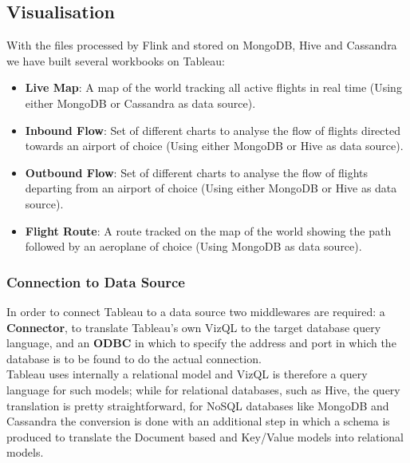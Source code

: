 \subsection{Visualisation}

With the files processed by Flink and stored on MongoDB, Hive and Cassandra we have built several workbooks on Tableau:

\begin{itemize}
	\item \textbf{Live Map}: A map of the world tracking all active flights in real time (Using either MongoDB or Cassandra as data source).
	\item \textbf{Inbound Flow}: Set of different charts to analyse the flow of flights directed towards an airport of choice (Using either MongoDB or Hive as data source).
	\item \textbf{Outbound Flow}: Set of different charts to analyse the flow of flights departing from an airport of choice (Using either MongoDB or Hive as data source).
	\item \textbf{Flight Route}: A route tracked on the map of the world showing the path followed by an aeroplane of choice (Using MongoDB as data source).
\end{itemize}
\subsubsection{Connection to Data Source}

In order to connect Tableau to a data source two middlewares are required: a \textbf{Connector}, to translate Tableau's own VizQL to the target database query language, and an \textbf{ODBC} in which to specify the address and port in which the database is to be found to do the actual connection.
\\
Tableau uses internally a relational model and VizQL is therefore a query language for such models; while for relational databases, such as Hive, the query translation is pretty straightforward, for NoSQL databases like MongoDB and Cassandra the conversion is done with an additional step in which a schema is produced to translate the Document based and Key/Value models into relational models.

